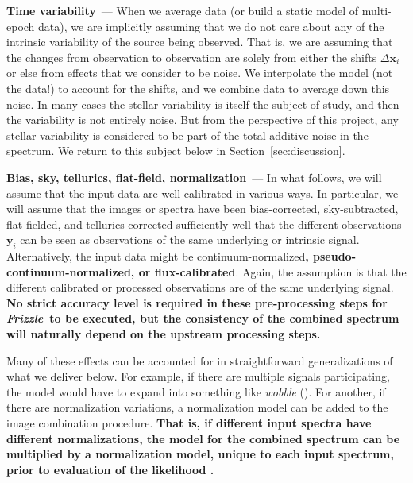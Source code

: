 \documentclass[modern, linenumbers]{aastex631}
\renewcommand{\paragraph}[1]{\medskip\par\noindent\textbf{#1}~---}
\newcommand{\sectionname}{Section}
\newcommand{\secref}[1]{\sectionname~\ref{#1}}
\newcommand{\name}{\textsl{Frizzle}}
\newcommand{\modified}[1]{\textcolor{Emerald}{\textbf{#1}}}
\begin{document}
\paragraph{Time variability}
When we average data (or build a static model of multi-epoch data), we are implicitly assuming that we do not care about any of the intrinsic variability of the source being observed.
That is, we are assuming that the changes from observation to observation are solely from either the shifts \modified{$\Delta\mathbf{x}_i$} or else from effects that we consider to be noise.
We interpolate the model (not the data!) to account for the shifts, and we combine data to average down this noise.
In many cases the stellar variability is itself the subject of study, and then the variability is not entirely noise.
But from the perspective of this project, any stellar variability is considered to be part of the total additive noise in the spectrum.
We return to this subject below in \secref{sec:discussion}.

\paragraph{Bias, sky, tellurics, flat-field, normalization}
In what follows, we will assume that the input data are well calibrated in various ways.
In particular, we will assume that the images or spectra have been bias-corrected, sky-subtracted, flat-fielded, and tellurics-corrected sufficiently well that the different observations \modified{$\mathbf{y}_i$} can be seen as observations of the same underlying or intrinsic signal.
Alternatively, the input data might be continuum-normalized\modified{, pseudo-continuum-normalized, or flux-calibrated}.
Again, the assumption is that the different calibrated or processed observations are of the same underlying signal. \modified{No strict accuracy level is required in these pre-processing steps for \name\ to be executed, but the consistency of the combined spectrum will naturally depend on the upstream processing steps.}

Many of these effects can be accounted for in straightforward generalizations of what we deliver below.
For example, if there are multiple signals participating, the model would have to expand into something like \textsl{wobble} (\citealt{wobble}).
For another, if there are normalization variations, a normalization model can be added to the image combination procedure.
\modified{That is, if different input spectra have different normalizations, the model for the combined spectrum can be multiplied by a normalization model, unique to each input spectrum, prior to evaluation of the likelihood \citep[e.g.,][]{Casey:2026}.}
\end{document}
